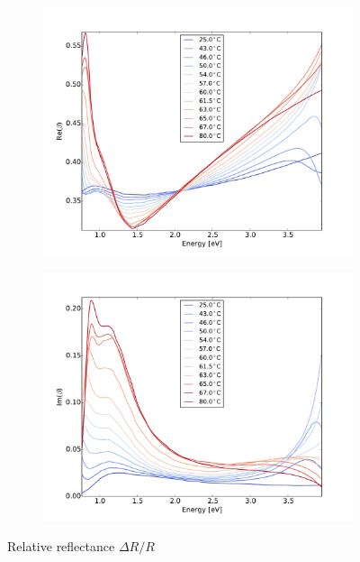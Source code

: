 \begin{figure}
    \begin{subfigure}[b]{0.49\textwidth}
        \centering
        \includegraphics[width=\textwidth]{Results/Sim3/re_beta.pdf}
        \caption{}
        \label{fig:2}
    \end{subfigure}
    \begin{subfigure}[b]{0.49\textwidth}
        \centering
        \includegraphics[width=\textwidth]{Results/Sim3/im_beta.pdf}
        \caption{}
        \label{fig:2}
    \end{subfigure}
    \caption{Relative reflectance $\Delta R/R$}
    \label{fig:}
\end{figure}
%

